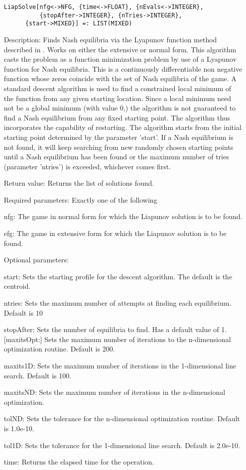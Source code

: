 \begin{itemize}
\protect \large \begin{verbatim}
LiapSolve[nfg<->NFG, {time<->FLOAT}, {nEvals<->INTEGER},
          {stopAfter->INTEGER}, {nTries->INTEGER},
	  {start->MIXED}] =: LIST(MIXED)
\end{verbatim}\normalsize


\bd
\item
[Description:] Finds Nash equilibria via the Lyapunov function method
described in \cite[1991]{McK:91}.  Works on either the
extensive or normal form.  This algorithm casts the problem as a
function minimization problem by use of a Lyapunov function for Nash
equilibria.  This is a continuously differentiable non negative
function whose zeros coincide with the set of Nash equilibria of the
game.  A standard descent algorithm is used to find a constrained
local minimum of the function from any given starting location.  Since
a local minimum need not be a global minimum (with value 0,) the
algorithm is not guaranteed to find a Nash equilibrium from any fixed
starting point.  The algorithm thus incorporates the capability of
restarting.  The algorithm starts from the initial starting point
determined by the parameter 'start'.  If a Nash equilibrium is not
found, it will keep searching from new randomly chosen starting points
until a Nash equilibrium has been found or the maximum number of tries
(parameter 'ntries') is exceeded, whichever comes first.
\item
[Return value:] Returns the list of solutions found.
\item
[Required parameters:] Exactly one of the following \hfil\null

\bd
\item
[nfg:] The game in normal form for which the Liapunov solution is to
be found.
\item
[efg:] The game in extensive form for which the Liapunov solution is
to be found.
\ed

\item
[Optional parameters:]\hfil\null

\bd
\item
[start:] Sets the starting profile for the descent algorithm.  The
default is the centroid.
\item
[ntries:] Sets the maximum number of attempts at finding each
equilibrium. Default is 10
\item
[stopAfter:] Sets the number of equilibria to find.  Has a default
value of 1.  [maxitsOpt:] Sets the maximum number of iterations to the
n-dimensional optimization routine.  Default is 200.
\item
[maxits1D:] Sets the maximum number of iterations in the
1-dimensional line search.  Default is 100.
\item
[maxitsND:] Sets the maximum number of iterations in the
n-dimensional optimization.  
\item
[tolND:] Sets the tolerance for the n-dimensional optimization
routine.  Default is 1.0e-10.
\item
[tol1D:] Sets the tolerance for the 1-dimensional line search.
Default is 2.0e-10.
\item
[time:] Returns the elapsed time for the operation.
\ed
\ed


\end{itemize}
